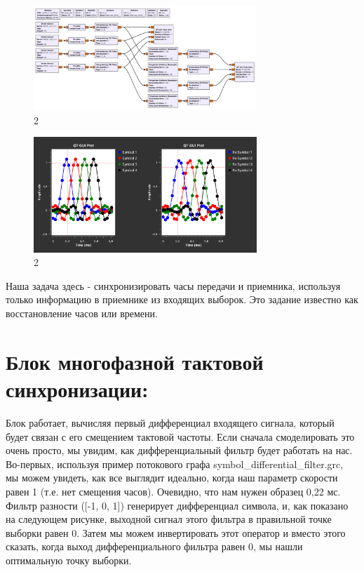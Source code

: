 \documentclass[10pt,a4paper,oneside]{article}
\begin{document}
\begin{figure}[H]
        \centering
        \includegraphics[width=0.75\textwidth]{pics/8.png}
        \caption{2}
        \label{fig:first}
\end{figure}

\begin{figure}[H]
        \centering
        \includegraphics[width=0.75\textwidth]{pics/9.png}
        \caption{2}
        \label{fig:first}
\end{figure}

Наша задача здесь - синхронизировать часы передачи и приемника, используя только информацию в приемнике из входящих выборок. Это задание известно как восстановление часов или времени.

\section{Блок многофазной тактовой синхронизации:}

Блок работает, вычисляя первый дифференциал входящего сигнала, который будет связан с его смещением тактовой частоты. Если сначала смоделировать это очень просто, мы увидим, как дифференциальный фильтр будет работать на нас. Во-первых, используя пример потокового графа symbol_differential_filter.grc, мы можем увидеть, как все выглядит идеально, когда наш параметр скорости равен 1 (т.е. нет смещения часов). Очевидно, что нам нужен образец 0,22 мс. Фильтр разности ([-1, 0, 1]) генерирует дифференциал символа, и, как показано на следующем рисунке, выходной сигнал этого фильтра в правильной точке выборки равен 0. Затем мы можем инвертировать этот оператор и вместо этого сказать, когда выход дифференциального фильтра равен 0, мы нашли оптимальную точку выборки.
\end{document}
